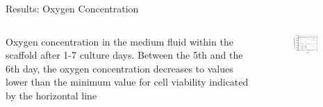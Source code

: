 \documentclass[11pt,t]{beamer}
\begin{document}
\begin{frame}[fragile]{Results: Oxygen Concentration}  

	\begin{columns}[t]
		\begin{column}{.5\textwidth}
Oxygen concentration in the medium fluid within the scaffold after 1-7 culture days. Between the 5th and the 6th day, the oxygen concentration decreases to values lower than the minimum value for cell
viability indicated by the horizontal line
	
 
		\end{column}
		\begin{column}{.5\textwidth}
			\vspace{-5pt}
			\begin{figure}
			\centering
			\includegraphics[width=0.7\textwidth]{math_tot_oxy}
			
			\end{figure}
		\end{column}
	\end{columns}	
		
\end{frame}
\end{document}
